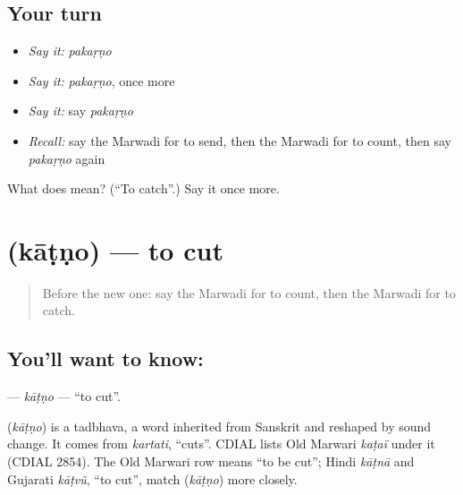 \subsection*{Your turn}
\begin{itemize}
\raggedright
  \item \emph{Say it:} \emph{pakaṛṇo}
  \item \emph{Say it:} \emph{pakaṛṇo}, once more
  \item \emph{Say it:} say \emph{pakaṛṇo}
  \item \emph{Recall:} say the Marwadi for to send, then the Marwadi for to count, then say \emph{pakaṛṇo} again
\end{itemize}

\begin{tcolorbox}[breakable,colback=teal!4,colframe=teal!35!black,title={Before you move on}]
What does  mean? (\textquotedblleft{}To catch\textquotedblright{}.) Say it once more.
\end{tcolorbox}
\section[\texorpdfstring{\mw{काटणो} (kāṭṇo)}{काटणो (kāṭṇo)}]{ (kāṭṇo) — to cut}

\label{lesson:MW-C56-katno}



\begin{quote}
Before the new one: say the Marwadi for to count, then the Marwadi for to catch.
\end{quote}

\subsection*{You'll want to know: }
\textbf{} — \emph{kāṭṇo} — \textquotedblleft{}to cut\textquotedblright{}.

\begin{cousinweb}
\textbf{} (\emph{kāṭṇo}) is a tadbhava, a word inherited from Sanskrit and reshaped by sound change. It comes from \emph{kartati}, \textquotedblleft{}cuts\textquotedblright{}. CDIAL lists Old Marwari \emph{kaṭaï} under it (CDIAL 2854). The Old Marwari row means \textquotedblleft{}to be cut\textquotedblright{}; Hindi \emph{kāṭnā} and Gujarati \emph{kāṭvũ}, \textquotedblleft{}to cut\textquotedblright{}, match \textbf{} (\emph{kāṭṇo}) more closely.
\end{cousinweb}

